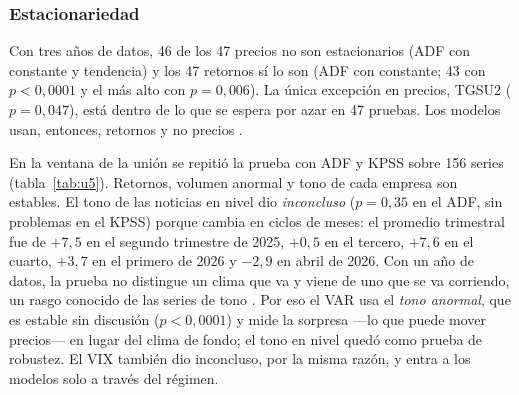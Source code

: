 \subsubsection{Estacionariedad}

Con tres años de datos, 46 de los 47 precios no son estacionarios (ADF con constante y
tendencia) y los 47 retornos sí lo son (ADF con constante; 43 con $p<0{,}0001$ y el más alto
con $p=0{,}006$). La única excepción en precios, TGSU2 ($p=0{,}047$), está dentro de lo que se
espera por azar en 47 pruebas. Los modelos usan, entonces, retornos y no precios
\citep{zablotsky2002,worthington2003}.

En la ventana de la unión se repitió la prueba con ADF y KPSS sobre 156 series
(tabla~\ref{tab:u5}). Retornos, volumen anormal y tono de cada empresa son estables. El tono de
las noticias en nivel dio \textit{inconcluso} ($p=0{,}35$ en el ADF, sin problemas en el KPSS)
porque cambia en ciclos de meses: el promedio trimestral fue de $+7{,}5$ en el segundo
trimestre de 2025, $+0{,}5$ en el tercero, $+7{,}6$ en el cuarto, $+3{,}7$ en el primero de
2026 y $-2{,}9$ en abril de 2026. Con un año de datos, la prueba no distingue un clima que va
y viene de uno que se va corriendo, un rasgo conocido de las series de tono
\citep{correarocha2026}. Por eso el VAR usa el \textit{tono anormal}, que es estable sin
discusión ($p<0{,}0001$) y mide la sorpresa —lo que puede mover precios— en lugar del clima de
fondo; el tono en nivel quedó como prueba de robustez. El VIX también dio inconcluso, por la
misma razón, y entra a los modelos solo a través del régimen.

